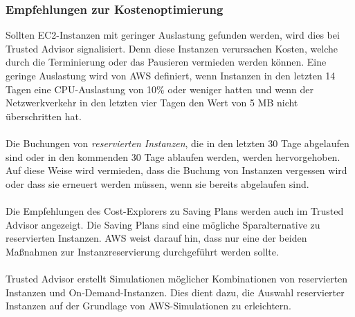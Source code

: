 \subsubsection*{Empfehlungen zur Kostenoptimierung}
Sollten EC2-Instanzen mit geringer Auslastung gefunden werden, wird dies bei Trusted Advisor signalisiert. Denn diese Instanzen verursachen Kosten, welche durch die Terminierung oder das Pausieren vermieden werden können. Eine geringe Auslastung wird von AWS definiert, wenn Instanzen in den letzten 14 Tagen eine CPU-Auslastung von 10\% oder weniger hatten und wenn der Netzwerkverkehr in den letzten vier Tagen den Wert von 5 MB nicht überschritten hat. 
\\\\
Die Buchungen von \textit{reservierten Instanzen}, die in den letzten 30 Tage abgelaufen sind oder in den kommenden 30 Tage ablaufen werden, werden hervorgehoben. Auf diese Weise wird vermieden, dass die Buchung von Instanzen vergessen wird oder dass sie erneuert werden müssen, wenn sie bereits abgelaufen sind.
\\\\
Die Empfehlungen des Cost-Explorers zu Saving Plans werden auch im Trusted Advisor angezeigt. Die Saving Plans sind eine mögliche Sparalternative zu reservierten Instanzen. AWS weist darauf hin, dass nur eine der beiden Maßnahmen zur Instanzreservierung durchgeführt werden sollte.
\\\\
Trusted Advisor erstellt Simulationen möglicher Kombinationen von reservierten Instanzen und On-Demand-Instanzen. Dies dient dazu, die Auswahl reservierter Instanzen auf der Grundlage von AWS-Simulationen zu erleichtern.

